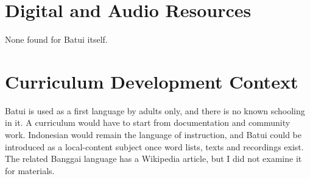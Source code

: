 \documentclass[12pt]{article}
\begin{document}
\section{Digital and Audio Resources}
None found for Batui itself.

\section{Curriculum Development Context}
Batui is used as a first language by adults only, and there is no known schooling in it. A curriculum would have to start from documentation and community work. Indonesian would remain the language of instruction, and Batui could be introduced as a local-content subject once word lists, texts and recordings exist. The related Banggai language has a Wikipedia article, but I did not examine it for materials.
\end{document}
